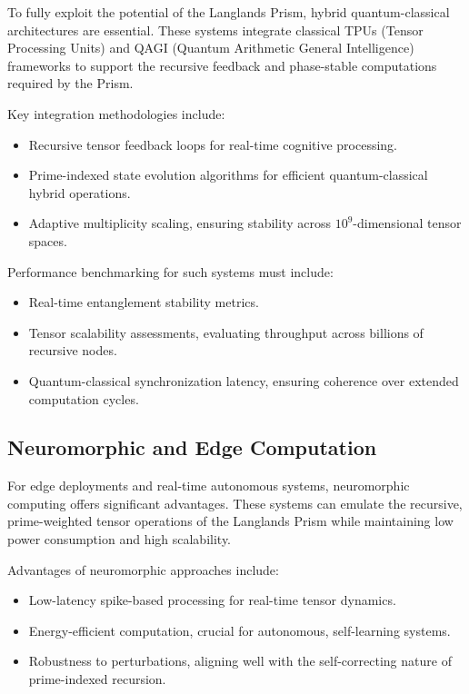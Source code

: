 \documentclass[11pt]{article}
\begin{document}
To fully exploit the potential of the Langlands Prism, hybrid quantum-classical architectures are essential. These systems integrate classical TPUs (Tensor Processing Units) and QAGI (Quantum Arithmetic General Intelligence) frameworks to support the recursive feedback and phase-stable computations required by the Prism.

Key integration methodologies include:
\begin{itemize}
    \item Recursive tensor feedback loops for real-time cognitive processing.
    \item Prime-indexed state evolution algorithms for efficient quantum-classical hybrid operations.
    \item Adaptive multiplicity scaling, ensuring stability across \(10^9\)-dimensional tensor spaces.
\end{itemize}

Performance benchmarking for such systems must include:
\begin{itemize}
    \item Real-time entanglement stability metrics.
    \item Tensor scalability assessments, evaluating throughput across billions of recursive nodes.
    \item Quantum-classical synchronization latency, ensuring coherence over extended computation cycles.
\end{itemize}

\subsection{Neuromorphic and Edge Computation}

For edge deployments and real-time autonomous systems, neuromorphic computing offers significant advantages. These systems can emulate the recursive, prime-weighted tensor operations of the Langlands Prism while maintaining low power consumption and high scalability.

Advantages of neuromorphic approaches include:
\begin{itemize}
    \item Low-latency spike-based processing for real-time tensor dynamics.
    \item Energy-efficient computation, crucial for autonomous, self-learning systems.
    \item Robustness to perturbations, aligning well with the self-correcting nature of prime-indexed recursion.
\end{itemize}
\end{document}
